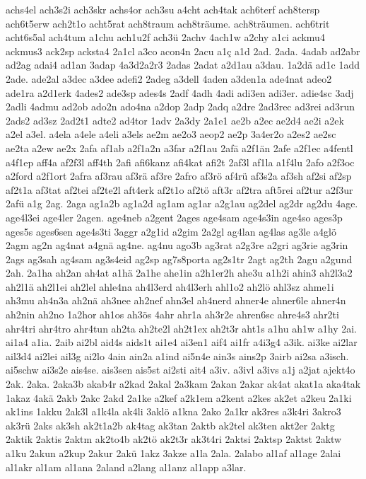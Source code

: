 {achs4el
ach3s2i
ach3skr
achs4or
ach3su
a4cht
ach4tak
ach6terf
ach8tersp
ach6t5erw
ach2t1o
acht5rat
ach8traum
ach8träume.
ach8träumen.
ach6trit
acht6s5al
ach4tum
a1chu
ach1u2f
ach3ü
2achv
4ach1w
a2chy
a1ci
ackmu4
ackmus3
ack2sp
acksta4
2a1cl
a3co
acon4n
2acu
a1ç
a1d
2ad.
2ada.
4adab
ad2abr
ad2ag
adai4
ad1an
3adap
4a3d2a2r3
2adas
2adat
a2d1au
a3dau.
1a2dä
ad1c
1add
2ade.
ade2al
a3dec
a3dee
adefi2
2adeg
a3dell
4aden
a3den1a
ade4nat
adeo2
ade1ra
a2d1erk
4ades2
ade3sp
ades4s
2adf
4adh
4adi
adi3en
adi3er.
adie4sc
3adj
2adli
4admu
ad2ob
ado2n
ado4na
a2dop
2adp
2adq
a2dre
2ad3rec
ad3rei
ad3run
2ads2
ad3sz
2ad2t1
adte2
ad4tor
1adv
2a3dy
2a1e1
ae2b
a2ec
ae2d4
ae2i
a2ek
a2el
a3el.
a4ela
a4ele
a4eli
a3els
ae2m
ae2o3
aeop2
ae2p
3a4er2o
a2es2
ae2sc
ae2ta
a2ew
ae2x
2afa
af1ab
a2f1a2n
a3far
a2f1au
2afä
a2f1än
2afe
a2f1ec
a4fentl
a4f1ep
aff4a
af2f3l
aff4th
2afi
afi6kanz
afi4kat
afi2t
2af3l
af1la
a1f4lu
2afo
a2f3oc
a2ford
a2f1ort
2afra
af3rau
af3rä
af3re
2afro
af3rö
af4rü
af3s2a
af3sh
af2si
af2sp
af2t1a
af3tat
af2tei
af2te2l
aft4erk
af2t1o
af2tö
aft3r
af2tra
aft5rei
af2tur
a2f3ur
2afü
a1g
2ag.
2aga
ag1a2b
ag1a2d
ag1am
ag1ar
a2g1au
ag2del
ag2dr
ag2du
4age.
age4l3ei
age4ler
2agen.
age4neb
a2gent
2ages
age4sam
age4s3in
age4so
ages3p
ages5s
ages6sen
age4s3ti
3aggr
a2g1id
a2gim
2a2gl
ag4lan
ag4las
ag3le
a4glö
2agm
ag2n
ag4nat
a4gnä
ag4ne.
ag4nu
ago3b
ag3rat
a2g3re
a2gri
ag3rie
ag3rin
2ags
ag3sah
ag4sam
ag3s4eid
ag2sp
ag7s8porta
ag2s1tr
2agt
ag2th
2agu
a2gund
2ah.
2a1ha
ah2an
ah4at
a1hä
2a1he
ahe1in
a2h1er2h
ahe3u
a1h2i
ahin3
ah2l3a2
ah2l1ä
ah2l1ei
ah2lel
ahle4na
ah4l3erd
ah4l3erh
ahl1o2
ah2lö
ahl3sz
ahme1i
ah3mu
ah4n3a
ah2nä
ah3nee
ah2nef
ahn3el
ah4nerd
ahner4e
ahner6le
ahner4n
ah2nin
ah2no
1a2hor
ah1os
ah3ös
4ahr
ahr1a
ah3r2e
ahren6sc
ahre4s3
ahr2ti
ahr4tri
ahr4tro
ahr4tun
ah2ta
ah2te2l
ah2t1ex
ah2t3r
aht1s
a1hu
ah1w
a1hy
2ai.
ai1a4
a1ia.
2aib
ai2bl
aid4s
aids1t
ai1e4
ai3en1
aif4
ai1fr
a4i3g4
a3ik.
ai3ke
ai2lar
ail3d4
ai2lei
ail3g
ai2lo
4ain
ain2a
a1ind
ai5n4e
ain3s
ains2p
3airb
ai2sa
a3isch.
ai5schw
ai3s2e
ais4se.
ais3sen
ais5st
ai2sti
ait4
a3iv.
a3ivl
a3ivs
a1j
a2jat
ajekt4o
2ak.
2aka.
2aka3b
akab4r
a2kad
2akal
2a3kam
2akan
2akar
ak4at
akat1a
aka4tak
1akaz
4akä
2akb
2akc
2akd
2a1ke
a2kef
a2k1em
a2kent
a2kes
ak2et
a2keu
2a1ki
ak1ins
1akku
2ak3l
a1k4la
ak4li
3aklö
a1kna
2ako
2a1kr
ak3res
a3k4ri
3akro3
ak3rü
2aks
ak3sh
ak2t1a2b
ak4tag
ak3tan
2aktb
ak2tel
ak3ten
akt2er
2aktg
2aktik
2aktis
2aktm
ak2to4b
ak2tö
ak2t3r
ak3t4ri
2aktsi
2aktsp
2aktst
2aktw
a1ku
2akun
a2kup
2akur
2akü
1akz
3akze
a1la
2ala.
2alabo
al1af
al1age
2alai
al1akr
al1am
al1ana
2aland
a2lang
al1anz
al1app
a3lar.
}
